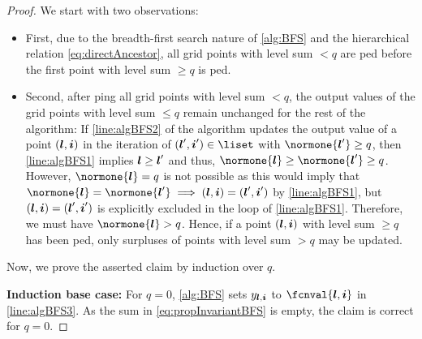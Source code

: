 \begin{proof}
  We start with two observations:
  
  \begin{itemize}
    \item
    First, due to the breadth-first search nature of \cref{alg:BFS} and the
    hierarchical relation \eqref{eq:directAncestor},
    all grid points with level sum $< q$ are \pop{}ped before
    the first point with level sum $\ge q$ is \pop{}ped.
    
    \item
    Second, after \pop{}ping all grid points with
    level sum $< q$, the output values of the grid points with
    level sum $\le q$ remain unchanged for the rest of the algorithm:
    If \cref{line:algBFS2} of the algorithm updates the output value of a point
    $({\boldsymbol{l}}, {\boldsymbol{i}})$ in the iteration of $(\*l', \*i') \in \liset$ with
    $\normone{\*l'} \ge q$, then \cref{line:algBFS1} implies
    ${\boldsymbol{l}} \ge {\boldsymbol{l}}'$ and thus, $\normone{\*l} \ge \normone{\*l'} \ge q$.
    However, $\normone{\*l} = q$ is not possible as
    this would imply that $\normone{\*l} = \normone{\*l'}
    \implies (\*l, \*i) = (\*l', \*i')$ by \cref{line:algBFS1},
    but $({\boldsymbol{l}}, {\boldsymbol{i}}) = ({\boldsymbol{l}}', {\boldsymbol{i}}')$ is explicitly excluded in the
    \texttt{\algorithmicfor} loop of \cref{line:algBFS1}.
    Therefore, we must have $\normone{\*l} > q$.
    Hence, if a point $({\boldsymbol{l}}, {\boldsymbol{i}})$ with level sum $\ge q$ has been \pop{}ped,
    only surpluses of points with level sum $> q$ may be updated.
  \end{itemize}
  
  \noindent
  Now, we prove the asserted claim by induction over $q$.
  
  \noindent
  \textbf{Induction base case:}
  For $q = 0$, \cref{alg:BFS} sets $\linout{\*l,\*i}$ to
  $\fcnval{\*l,\*i}$ in \cref{line:algBFS3}.
  As the sum in \eqref{eq:propInvariantBFS} is empty,
  the claim is correct for $q = 0$.
  

\end{proof}
